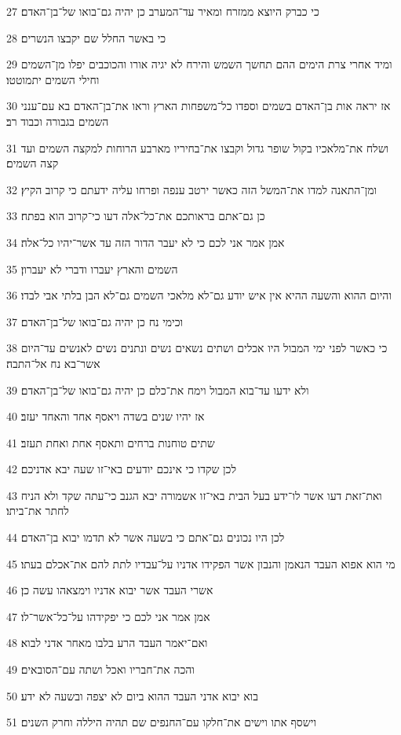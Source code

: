 \par 27 כי כברק היוצא ממזרח ומאיר עד־המערב כן יהיה גם־בואו של־בן־האדם׃
\par 28 כי באשר החלל שם יקבצו הנשרים׃
\par 29 ומיד אחרי צרת הימים ההם תחשך השמש והירח לא יגיה אורו והכוכבים יפלו מן־השמים וחילי השמים יתמוטטו׃
\par 30 אז יראה אות בן־האדם בשמים וספדו כל־משפחות הארץ וראו את־בן־האדם בא עם־ענני השמים בגבורה וכבוד רב׃
\par 31 ושלח את־מלאכיו בקול שופר גדול וקבצו את־בחיריו מארבע הרוחות למקצה השמים ועד קצה השמים׃
\par 32 ומן־התאנה למדו את־המשל הזה כאשר ירטב ענפה ופרחו עליה ידעתם כי קרוב הקיץ׃
\par 33 כן גם־אתם בראותכם את־כל־אלה דעו כי־קרוב הוא בפתח׃
\par 34 אמן אמר אני לכם כי לא יעבר הדור הזה עד אשר־יהיו כל־אלה׃
\par 35 השמים והארץ יעברו ודברי לא יעברון׃
\par 36 והיום ההוא והשעה ההיא אין איש יודע גם־לא מלאכי השמים גם־לא הבן בלתי אבי לבדו׃
\par 37 וכימי נח כן יהיה גם־בואו של־בן־האדם׃
\par 38 כי כאשר לפני ימי המבול היו אכלים ושתים נשאים נשים ונתנים נשים לאנשים עד־היום אשר־בא נח אל־התבה׃
\par 39 ולא ידעו עד־בוא המבול וימח את־כלם כן יהיה גם־בואו של־בן־האדם׃
\par 40 אז יהיו שנים בשדה ויאסף אחד והאחד יעזב׃
\par 41 שתים טוחנות ברחים ותאסף אחת ואחת תעזב׃
\par 42 לכן שקדו כי אינכם יודעים באי־זו שעה יבא אדניכם׃
\par 43 ואת־זאת דעו אשר לו־ידע בעל הבית באי־זו אשמורה יבא הגנב כי־עתה שקד ולא הניח לחתר את־ביתו׃
\par 44 לכן היו נכונים גם־אתם כי בשעה אשר לא תדמו יבוא בן־האדם׃
\par 45 מי הוא אפוא העבד הנאמן והנבון אשר הפקידו אדניו על־עבדיו לתת להם את־אכלם בעתו׃
\par 46 אשרי העבד אשר יבוא אדניו וימצאהו עשה כן׃
\par 47 אמן אמר אני לכם כי יפקידהו על־כל־אשר־לו׃
\par 48 ואם־יאמר העבד הרע בלבו מאחר אדני לבוא׃
\par 49 והכה את־חבריו ואכל ושתה עם־הסובאים׃
\par 50 בוא יבוא אדני העבד ההוא ביום לא יצפה ובשעה לא ידע׃
\par 51 וישסף אתו וישים את־חלקו עם־החנפים שם תהיה היללה וחרק השנים׃

